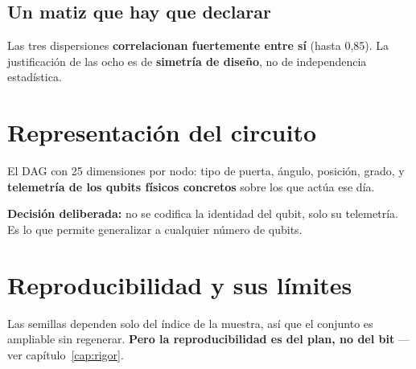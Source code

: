 \subsection{Un matiz que hay que declarar}
Las tres dispersiones \textbf{correlacionan fuertemente entre sí} (hasta 0,85). La
justificación de las ocho es de \textbf{simetría de diseño}, no de independencia estadística.

\section{Representación del circuito}
\label{sec:representacion}
El DAG con 25 dimensiones por nodo: tipo de puerta, ángulo, posición, grado, y
\textbf{telemetría de los qubits físicos concretos} sobre los que actúa ese día.

\textbf{Decisión deliberada:} no se codifica la identidad del qubit, solo su telemetría. Es lo
que permite generalizar a cualquier número de qubits.

\section{Reproducibilidad y sus límites}
\label{sec:reproducibilidad}
Las semillas dependen solo del índice de la muestra, así que el conjunto es ampliable sin
regenerar. \textbf{Pero la reproducibilidad es del plan, no del bit} —ver
capítulo~\ref{cap:rigor}.
